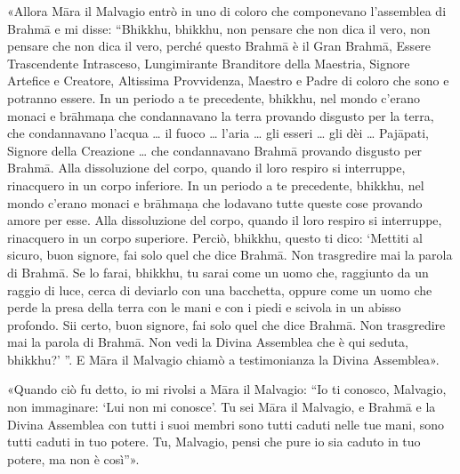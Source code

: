 «Allora Māra il Malvagio entrò in uno di coloro che componevano l’assemblea di
Brahmā e mi disse: “Bhikkhu, bhikkhu, non pensare che non dica il vero, non
pensare che non dica il vero, perché questo Brahmā è il Gran Brahmā, Essere
Trascendente Intrasceso, Lungimirante Branditore della Maestria, Signore
Artefice e Creatore, Altissima Provvidenza, Maestro e Padre di coloro che sono e
potranno essere. In un periodo a te precedente, bhikkhu, nel mondo c’erano
monaci e brāhmaṇa che condannavano la terra provando disgusto per la terra, che
condannavano l’acqua … il fuoco … l’aria … gli esseri … gli dèi … Pajāpati,
Signore della Creazione … che condannavano Brahmā provando disgusto per Brahmā.
Alla dissoluzione del corpo, quando il loro respiro si interruppe, rinacquero in
un corpo inferiore. In un periodo a te precedente, bhikkhu, nel mondo c’erano
monaci e brāhmaṇa che lodavano tutte queste cose provando amore per esse. Alla
dissoluzione del corpo, quando il loro respiro si interruppe, rinacquero in un
corpo superiore. Perciò, bhikkhu, questo ti dico: ‘Mettiti al sicuro, buon
signore, fai solo quel che dice Brahmā. Non trasgredire mai la parola di Brahmā.
Se lo farai, bhikkhu, tu sarai come un uomo che, raggiunto da un raggio di luce,
cerca di deviarlo con una bacchetta, oppure come un uomo che perde la presa
della terra con le mani e con i piedi e scivola in un abisso profondo. Sii
certo, buon signore, fai solo quel che dice Brahmā. Non trasgredire mai la
parola di Brahmā. Non vedi la Divina Assemblea che è qui seduta, bhikkhu?’ ”. E
Māra il Malvagio chiamò a testimonianza la Divina Assemblea».

«Quando ciò fu detto, io mi rivolsi a Māra il Malvagio: “Io ti conosco,
Malvagio, non immaginare: ‘Lui non mi conosce’. Tu sei Māra il Malvagio, e
Brahmā e la Divina Assemblea con tutti i suoi membri sono tutti caduti nelle tue
mani, sono tutti caduti in tuo potere. Tu, Malvagio, pensi che pure io sia
caduto in tuo potere, ma non è così”».

